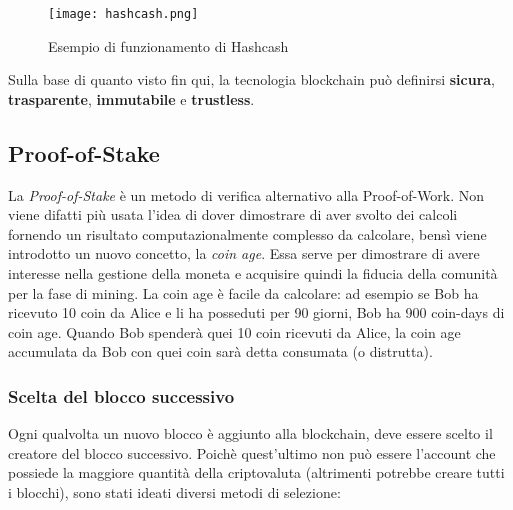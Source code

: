 \begin{figure}[htbp]
  \centering
  \texttt{[image: hashcash.png]}
  \caption{Esempio di funzionamento di Hashcash}
  \label{fig:hashcash}
\end{figure}

Sulla base di quanto visto fin qui, la tecnologia blockchain può definirsi \textbf{sicura}, \textbf{trasparente}, \textbf{immutabile} e \textbf{trustless}.

\subsection{Proof-of-Stake}
La \textit{Proof-of-Stake} è un metodo di verifica alternativo alla Proof-of-Work. Non viene difatti più usata l'idea di dover dimostrare di aver svolto dei calcoli fornendo un risultato computazionalmente complesso da calcolare, bensì viene introdotto un nuovo concetto, la \textit{coin age}. Essa serve per dimostrare di avere interesse nella gestione della moneta e acquisire quindi la fiducia della comunità per la fase di mining. La coin age è facile da calcolare: ad esempio se Bob ha ricevuto 10 coin da Alice e li ha posseduti per 90 giorni, Bob ha 900 coin-days di coin age. Quando Bob spenderà quei 10 coin ricevuti da Alice, la coin age accumulata da Bob con quei coin sarà detta consumata (o distrutta).

\subsubsection{Scelta del blocco successivo}
Ogni qualvolta un nuovo blocco è aggiunto alla blockchain, deve essere scelto il creatore del blocco successivo. Poichè quest'ultimo non può essere l'account che possiede la maggiore quantità della criptovaluta (altrimenti potrebbe creare tutti i blocchi), sono stati ideati diversi metodi di selezione:

